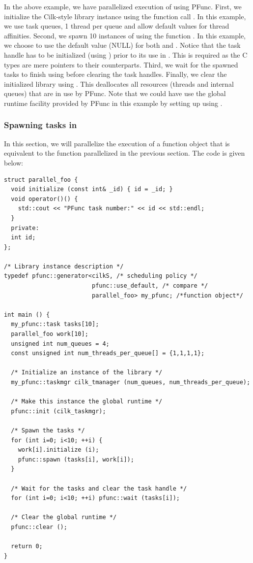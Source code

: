 In the above example, we have parallelized execution of 
using PFunc. First, we initialize the Cilk-style library instance using the
function call . In this example, we use task
queues, 1 thread per queue and allow default values for thread affinities.
Second, we spawn 10 instances of  using the function
. In this example, we choose to use the default value
(NULL) for both  and . Notice that the task handle
has to be initialized (using ) prior to its use in
. This is required as the C types are mere pointers to
their \Cpp{} counterparts. Third, we wait for the spawned tasks to finish using
 before clearing the task handles. Finally, we clear the
initialized library using . This deallocates all
resources (threads and internal queues) that are in use by PFunc. Note that we 
could have use the global runtime facility provided by PFunc in this example
by setting up  using .

\subsubsection{Spawning tasks in \Cpp{}}
\label{subsubsec:spawn_cxx}
In this section, we will parallelize the execution of a function object that is
equivalent to the function parallelized in the previous section. The code is 
given below:

\begin{lstlisting}
struct parallel_foo {
  void initialize (const int& _id) { id = _id; }
  void operator()() {
    std::cout << "PFunc task number:" << id << std::endl;
  }
  private:
  int id;
};

/* Library instance description */
typedef pfunc::generator<cilkS, /* scheduling policy */
                         pfunc::use_default, /* compare */
                         parallel_foo> my_pfunc; /*function object*/

int main () {
  my_pfunc::task tasks[10];
  parallel_foo work[10];
  unsigned int num_queues = 4;
  const unsigned int num_threads_per_queue[] = {1,1,1,1};

  /* Initialize an instance of the library */
  my_pfunc::taskmgr cilk_tmanager (num_queues, num_threads_per_queue);

  /* Make this instance the global runtime */
  pfunc::init (cilk_taskmgr);

  /* Spawn the tasks */
  for (int i=0; i<10; ++i) {
    work[i].initialize (i);
    pfunc::spawn (tasks[i], work[i]);
  }

  /* Wait for the tasks and clear the task handle */
  for (int i=0; i<10; ++i) pfunc::wait (tasks[i]);

  /* Clear the global runtime */
  pfunc::clear ();

  return 0;
}
\end{lstlisting}

